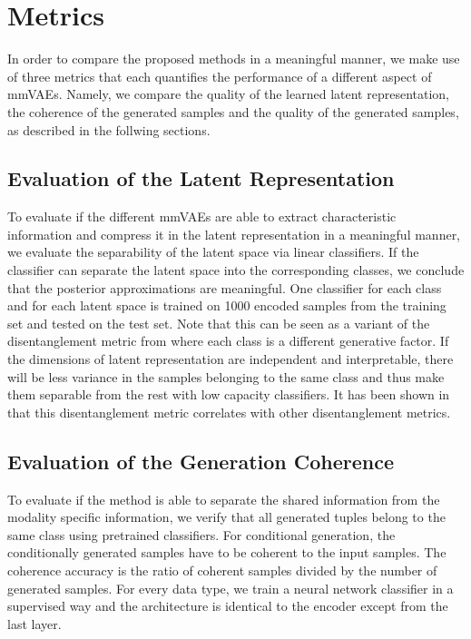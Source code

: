 

\section{Metrics}
In order to compare the proposed methods in a meaningful manner, we make use of three metrics that each quantifies the performance of a different aspect of mmVAEs.
Namely, we compare the quality of the learned latent representation, the coherence of the generated samples and the quality of the generated samples, as described in the follwing sections.

\subsection{Evaluation of the Latent Representation} \label{subsec:lr metric}
To evaluate if the different mmVAEs are able to extract characteristic information and compress it in the latent representation in a meaningful manner, we evaluate the separability of the latent space via linear classifiers.
If the classifier can separate the latent space into the corresponding classes, we conclude that the posterior approximations are meaningful.
One classifier for each class and for each latent space is trained on 1000 encoded samples from the training set and tested on the test set.
Note that this can be seen as a variant of the disentanglement metric from \citep{beta_vae} where each class is a different generative factor.
If the dimensions of latent representation are independent and interpretable, there will be less variance in the samples belonging to the same class and thus make them separable from the rest with low capacity classifiers.
It has been shown in \citep{locatello_challenging_2019} that this disentanglement metric correlates with other disentanglement metrics.

\subsection{Evaluation of the Generation Coherence}
\label{subsubsec:gen_coh}
To evaluate if the method is able to separate the shared information from the modality specific information, we verify that all generated tuples belong to the same class using pretrained classifiers.
For conditional generation, the conditionally generated samples have to be coherent to the input samples.
The coherence accuracy is the ratio of coherent samples divided by the number of generated samples.
For every data type, we train a neural network classifier in a supervised way and the architecture is identical to the encoder except from the last layer.


